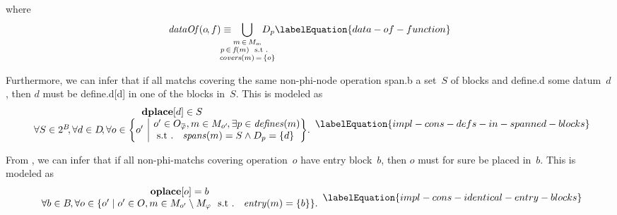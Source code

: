 %
where
%
\begin{equation}
  \mDataOf(o \hspace{-1pt}, f)
  \equiv
  \hspace{-1.5em}
  \bigcup_{\substack{%
                   m \, \in \, \mMatchSet[o] \hspace{-.8pt}, \\
                   p \, \in \, f\hspace{-1pt}(m) \text{ \st} \\
                   \mCovers(m) \, = \, \mSet{o}
                 }}
  \hspace{-1.5em}
  \mDataSet[p]
  \labelEquation{data-of-function}
\end{equation}

Furthermore, we can infer that if all \glspl{match} covering the same
non-\gls{phi-node} \gls{operation} \gls{span.b} a set~$S$ of \glspl{block} and
\gls{define.d} some \gls{datum}~$d$\hspace{-1pt}, then $d$ must be
\gls{define.d}[d] in one of the \glspl{block} in~$S$\hspace{-.8pt}.
%
This is modeled as
%
\begin{equation}
  \begin{array}{c}
    \mVar{dplace}[d] \in S \\
    \forall S \in \mPowerset{\mBlockSet} \hspace{-2pt},
    \forall d \in \mDataSet \!,
    \forall o \in
      \mSetBuilder*{o'}%
                   {%
                     \begin{array}{@{}l@{}}
                       o' \in \mOpCompSet{\mPhi},
                       m \in \mMatchSet[o'] \hspace{-1pt},
                       \exists p \in \mDefines(m) \\
                       \text{\st }
                       \mSpans(m) = S \mAnd \mDataSet[p] = \mSet{d}
                     \end{array}
                   } \!.
  \end{array}
  \labelEquation{impl-cons-defs-in-spanned-blocks}
\end{equation}

From , we can infer that if all
non-\glspl{phi-match} covering \gls{operation}~$o$ have \gls{entry
  block}~$b$\hspace{-1pt}, then $o$ must for sure be placed in~$b$\hspace{-1pt}.
%
This is modeled as
%
\begin{equation}
  \begin{array}{c}
    \mVar{oplace}[o] = b \\
    \forall b \in \mBlockSet \hspace{-1pt},
    \forall o \in
      \mSetBuilder{o'}%
                  {%
                    o' \in \mOpSet,
                    m \in \mMatchSet[o'] \setminus \mPhiMatchSet
                    \text{ \st }
                    \mEntry(m) = \mSet{b}
                  }.
  \end{array}
  \labelEquation{impl-cons-identical-entry-blocks}
\end{equation}

